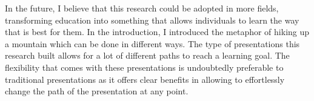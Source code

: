 \documentclass[twoside, 12pt]{article}
\begin{document}
In the future, I believe that this research could be adopted in more fields, transforming education into something that allows individuals to learn the way that is best for them. In the introduction, I introduced the metaphor of hiking up a mountain which can be done in different ways. The type of presentations this research built allows for a lot of different paths to reach a learning goal. The flexibility that comes with these presentations is undoubtedly preferable to traditional presentations as it offers clear benefits in allowing to effortlessly change the path of the presentation at any point.\\


\newpage

{}

\end{document}
